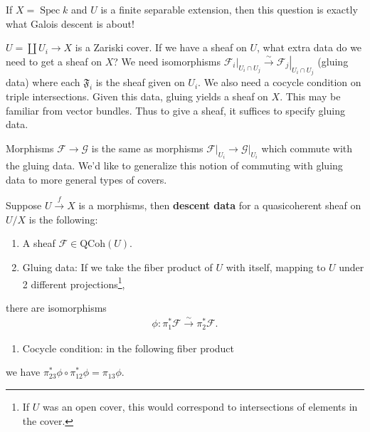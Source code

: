\begin{remark}

If \(X = \operatorname{Spec}k\) and \(U\) is a finite separable
extension, then this question is exactly what Galois descent is about!

\end{remark}

\begin{example}

\(U = {\coprod}U_i \to X\) is a Zariski cover. If we have a sheaf on
\(U\), what extra data do we need to get a sheaf on \(X\)? We need
isomorphisms
\({ \left.{{\mathcal{F}_i }} \right|_{{U_i\cap U_j}} } \xrightarrow{\sim} { \left.{{\mathcal{F}_j}} \right|_{{U_i\cap U_j}} }\)
(gluing data) where each \(\mathfrak{F}_i\) is the sheaf given on
\(U_i\). We also need a cocycle condition on triple intersections. Given
this data, gluing yields a sheaf on \(X\). This may be familiar from
vector bundles. Thus to give a sheaf, it suffices to specify gluing
data.

Morphisms \(\mathcal{F}\to \mathcal{G}\) is the same as morphisms
\({ \left.{{\mathcal{F}}} \right|_{{U_i}} } \to { \left.{{\mathcal{G}}} \right|_{{U_i}} }\)
which commute with the gluing data. We'd like to generalize this notion
of commuting with gluing data to more general types of covers.

\end{example}

\begin{definition}

Suppose \(U\xrightarrow{f}X\) is a morphisms, then \textbf{descent data}
for a quasicoherent sheaf on \(U/X\) is the following:

\begin{enumerate}
\def\labelenumi{\arabic{enumi}.}
\tightlist
\item
  A sheaf \(\mathcal{F}\in {\mathrm{QCoh}}(U)\).
\item
  Gluing data: If we take the fiber product of \(U\) with itself,
  mapping to \(U\) under 2 different projections\footnote{If \(U\) was
    an open cover, this would correspond to intersections of elements in
    the cover.},
\end{enumerate}

there are isomorphisms
\begin{align*}  
  \phi: \pi_1^* \mathcal{F} \xrightarrow{\sim} \pi_2^* \mathcal{F}
  .\end{align*}

\begin{enumerate}
\def\labelenumi{\arabic{enumi}.}
\setcounter{enumi}{2}
\tightlist
\item
  Cocycle condition: in the following fiber product
\end{enumerate}

we have \(\pi_{23}^* \phi \circ \pi_{12}^* \phi = \pi_{13}\phi\).

\end{definition}

